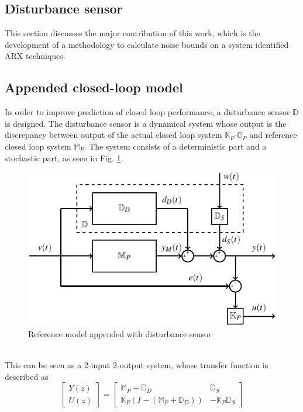 \documentclass[letterpaper, 10 pt, conference]{ieeeconf}  %
\begin{document}
\begin{enumerate}
	\section{Disturbance sensor}
	\label{Contribution}
	This section discusses the major contribution of this work, which is the development of a methodology to calculate noise bounds on a system identified ARX techniques.
	\subsection{Appended closed-loop model}
	In order to improve prediction of closed loop performance, a disturbance sensor $\mathbb{D}$ is designed. The disturbance sensor is a dynamical system whose output is the discrepancy between output of the actual closed loop system  $\mathbb{K}_P$-$\mathbb{G}_P$ and reference closed loop system $\mathbb{M}_P$. The system consists of a deterministic part and a stochastic part, as seen in Fig. \ref{Appended}.
	\begin{figure}[h]
		\hspace{30pt}
		\includegraphics[scale = 0.7]{Mp-D-E.pdf}
		\caption{Reference model appended with disturbance sensor}
		\label{Appended}
	\end{figure}
	\\
	This can be seen as a 2-input 2-output system, whose transfer function is described as
	\begin{equation}
	\begin{bmatrix}
		Y(z) \\ U(z)
	 \end{bmatrix} = 
	 \begin{bmatrix} 
	 \mathbb{M}_P+\mathbb{D}_D & \mathbb{D}_S \\
	 \mathbb{K}_P(I-(\mathbb{M}_P+\mathbb{D}_D)) &  -\mathbb{K}_P\mathbb{D}_S

\end{bmatrix}
\end{equation}
\end{enumerate}
\end{document}
